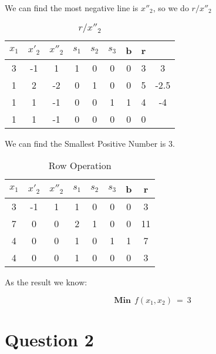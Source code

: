 \documentclass{article}
\begin{document}
  We can find the most negative line is $x''_2$, so we do $r/x''_2$

  \begin{table}[H]
  \centering
  \caption{$r/x''_2$}
  \begin{tabular}{|c|c|c|c|c|c|c|c|c|}
  \hline
  $x_1$ & $x'_2$ & $x''_2$  & $s_1$ & $s_2$ & $s_3$ & b & r &      \\ \hline
  3    & -1    & 1       & 1    & 0    & 0    & 0 & 3 & 3    \\ \hline
  1    & 2     & -2      & 0    & 1    & 0    & 0 & 5 & -2.5 \\ \hline
  1    & 1     & -1      & 0    & 0    & 1    & 1 & 4 & -4   \\ \hline
  1    & 1     & -1      & 0    & 0    & 0    & 0 & 0 &      \\ \hline
  \end{tabular}
  \end{table}

  We can find the Smallest Positive Number is $3$.

  \begin{table}[H]
  \centering
  \caption{Row Operation}
  \begin{tabular}{|c|c|c|c|c|c|c|c|}
  \hline
  $x_1$ & $x'_2$ & $x''_2$  & $s_1$ & $s_2$ & $s_3$ & b & r \\ \hline
  3    & -1    & 1       & 1    & 0    & 0    & 0 & 3  \\ \hline
  7    & 0     & 0       & 2    & 1    & 0    & 0 & 11 \\ \hline
  4    & 0     & 0       & 1    & 0    & 1    & 1 & 7  \\ \hline
  4    & 0     & 0       & 1    & 0    & 0    & 0 & 3  \\ \hline
  \end{tabular}
  \end{table}

  As the result we know:

  $$ \textbf{Min}\:\: f(x_1,x_2) \: =\: 3 $$


  \section{Question 2}
\end{document}
